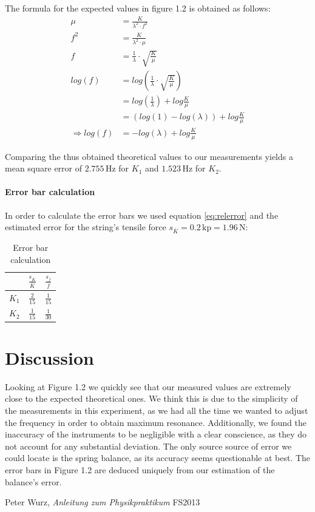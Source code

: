 \documentclass{scrreprt}
\newcommand{\unit}[1]{\ensuremath{\, \mathrm{#1}}}
\begin{document}
The formula for the expected values in figure 1.2 is obtained as follows:
\begin{align}
\mu &= \frac{K}{\lambda^2 \cdot f^2}\\
f^2 &= \frac{K}{\lambda^2\cdot\mu}\\
f &= \frac{1}{\lambda}\cdot\sqrt{\frac{K}{\mu}}\\
log(f) &= log\left(\frac{1}{\lambda}\cdot\sqrt{\frac{K}{\mu}}\right)\\
&=log\left(\frac{1}{\lambda}\right) + log\frac{K}{\mu}\\
&=\left(log(1) - log(\lambda)\right) + log\frac{K}{\mu}\\
\Rightarrow log(f) &=-log(\lambda) + log\frac{K}{\mu}
\end{align}

Comparing the thus obtained theoretical values to our measurements yields a mean square error of $2.755\unit{Hz}$ for $K_1$ and $1.523\unit{Hz}$ for $K_2$.

\paragraph*{Error bar calculation} In order to calculate the error bars we used equation \ref{eq:relerror} and the estimated error for the string's tensile force $s_{\overline{K}}=0.2 \unit{kp} = 1.96 \unit{N}$:

\begin{table}[H]
\center
\begin{tabular}{|c|cc|}
\cline{2-3}
\multicolumn{1}{c|}{}& \tiny $\frac{s_{\overline{K}}}{\overline{K}}$ & \tiny$\frac{s_{\bar{f}}}{\bar{f}}$\\ \hline
$K_1$ & \small$\frac{2}{15}$ & \small$\frac{1}{15}$ \\ \hline
$K_2$ & \small$\frac{1}{15}$ & \small$\frac{1}{30}$\\ \hline
\end{tabular}
\caption{Error bar calculation}
\end{table}



\section{Discussion}
Looking at Figure 1.2 we quickly see that our measured values are extremely close to the expected theoretical ones. We think this is due to the simplicity of the measurements in this experiment, as we had all the time we wanted to adjust the frequency in order to obtain maximum resonance. Additionally, we found the inaccuracy of the instruments to be negligible with a clear conscience, as they do not account for any substantial deviation. The only source source of error we could locate is the spring balance, as its accuracy seems questionable at best. The error bars in Figure 1.2 are deduced uniquely from our estimation of the balance's error. 

\begin{thebibliography}{9}

  Peter Wurz,
  \emph{Anleitung zum Physikpraktikum}
  FS2013

\end{thebibliography}
\end{document}
